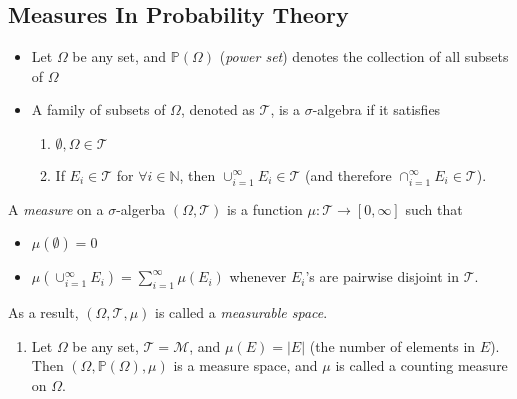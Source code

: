\subsection{Measures In Probability Theory}

\begin{definition}
\begin{itemize}
\item
Let $\Omega$ be any set, and $\mathbb{P}(\Omega)$ (\emph{power set}) denotes the collection of all subsets of $\Omega$
\item
A family of subsets of $\Omega$, denoted as $\mathcal{T}$, is a $\sigma$-algebra if it satisfies
\begin{enumerate}
\item
$\emptyset,\Omega\in\mathcal{T}$
\item
If $E_i\in\mathcal{T}$ for $\forall i\in\mathbb{N}$,
then $\cup_{i=1}^\infty E_i\in\mathcal{T}$ (and therefore $\cap_{i=1}^\infty E_i\in\mathcal{T}$).
\end{enumerate}
\end{itemize}
\end{definition}

\begin{definition}[Measure]
A \emph{measure} on a $\sigma$-algerba $(\Omega,\mathcal{T})$ is a function 
$\mu:\mathcal{T}\to[0,\infty]$ 
such that
\begin{itemize}
\item
$\mu(\emptyset) = 0$
\item
$\mu(\cup_{i=1}^\infty E_i)=\sum_{i=1}^\infty\mu(E_i)$ whenever $E_i$'s are pairwise disjoint in $\mathcal{T}$.
\end{itemize}
As a result, $(\Omega,\mathcal{T},\mu)$ is called a \emph{measurable space}.
\end{definition}

\begin{example}
\begin{enumerate}
\item
Let $\Omega$ be any set, $\mathcal{T}=\mathcal{M}$, and $\mu(E)=|E|$ (the number of elements in $E$). Then $(\Omega,\mathbb{P}(\Omega),\mu)$ is a measure space, and $\mu$ is called a counting measure on $\Omega$.
\end{enumerate}
\end{example}


